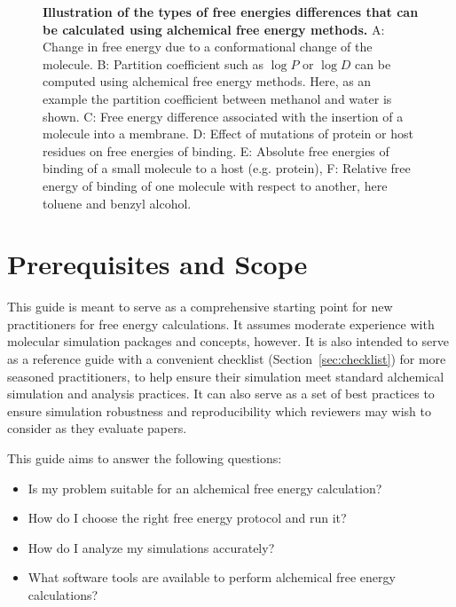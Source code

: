 \documentclass[9pt,bestpractices]{livecoms}
\begin{document}
\begin{figure}
    \caption{\textbf{Illustration of the types of free energies differences that can be calculated using alchemical free energy methods.} A: Change in free energy due to a conformational change of the molecule. B: Partition coefficient such as $\log P$ or $\log D$ can be computed using alchemical free energy methods. Here, as an example the partition coefficient between methanol and water is shown. C: Free energy difference associated with the insertion of a molecule into a membrane. D: Effect of mutations of protein or host residues on free energies of binding.  E: Absolute free energies of binding of a small molecule to a host (e.g. protein), F: Relative free energy of binding of one molecule with respect to another, here toluene and benzyl alcohol.
    \label{fig:fig_what_is_alchemy}
    }
\end{figure}

\section{Prerequisites and Scope}
\label{sec:pre}
This guide is meant to serve as a comprehensive starting point for new practitioners for free energy calculations.  It assumes moderate experience with molecular simulation packages and concepts, however.  It is also intended to serve as a reference guide with a convenient checklist (Section~\ref{sec:checklist}) for more seasoned practitioners, to help ensure their simulation meet standard alchemical simulation and analysis practices. It can also serve as a set of best practices to ensure simulation robustness and reproducibility which reviewers may wish to consider as they evaluate papers.

This guide aims to answer the following questions:
\begin{itemize}
    \item Is my problem suitable for an alchemical free energy calculation? 
    \item How do I choose the right free energy protocol and run it? 
    \item How do I analyze my simulations accurately? 
    \item What software tools are available to perform alchemical free energy calculations? 
\end{itemize}
\end{document}
